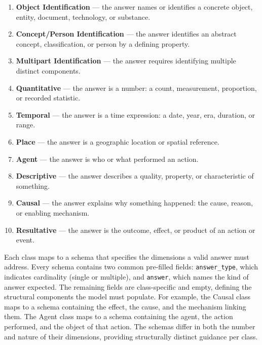 \documentclass{article}
\begin{document}
\begin{enumerate}
  \item \textbf{Object Identification} --- the answer names or identifies a concrete object, entity, document, technology, or substance.
  \item \textbf{Concept/Person Identification} --- the answer identifies an abstract concept, classification, or person by a defining property.
  \item \textbf{Multipart Identification} --- the answer requires identifying multiple distinct components.
  \item \textbf{Quantitative} --- the answer is a number: a count, measurement, proportion, or recorded statistic.
  \item \textbf{Temporal} --- the answer is a time expression: a date, year, era, duration, or range.
  \item \textbf{Place} --- the answer is a geographic location or spatial reference.
  \item \textbf{Agent} --- the answer is who or what performed an action.
  \item \textbf{Descriptive} --- the answer describes a quality, property, or characteristic of something.
  \item \textbf{Causal} --- the answer explains why something happened: the cause, reason, or enabling mechanism.
  \item \textbf{Resultative} --- the answer is the outcome, effect, or product of an action or event.
\end{enumerate}

Each class maps to a schema that specifies the dimensions a valid answer must address. Every schema contains two common pre-filled fields: \texttt{answer\_type}, which indicates cardinality (single or multiple), and \texttt{answer}, which names the kind of answer expected. The remaining fields are class-specific and empty, defining the structural components the model must populate. For example, the Causal class maps to a schema containing the effect, the cause, and the mechanism linking them. The Agent class maps to a schema containing the agent, the action performed, and the object of that action. The schemas differ in both the number and nature of their dimensions, providing structurally distinct guidance per class.
\end{document}
